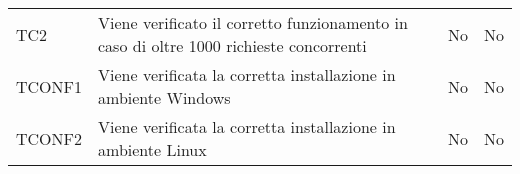 \begin{longtable}{
		>{\centering}p{}
		>{}p{}
		>{\centering}p{}
		>{\centering}p{} }
		TC2 & Viene verificato il corretto funzionamento in caso di oltre 1000 richieste concorrenti &
		No &
		No \tabularnewline
		
		
		
		
		TCONF1 & Viene verificata la corretta installazione in ambiente Windows &
		No &
		No \tabularnewline
		
		TCONF2 & Viene verificata la corretta installazione in ambiente Linux &
		No &
		No \tabularnewline


\end{longtable}
